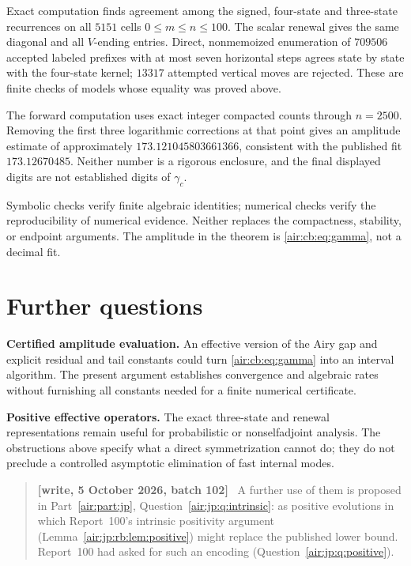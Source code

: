 \documentclass[11pt,letterpaper]{article}
\numberwithin{equation}{section}
\theoremstyle{remark}
\newenvironment{writenotejp}{\par\smallskip\begin{quote}\small\textbf{[write, 5 October 2026, batch 102]}\ }{\end{quote}\smallskip}
\begin{document}
Exact computation finds agreement among the signed, four-state and
three-state recurrences on all $5151$ cells $0\le m\le n\le100$.
The scalar renewal gives the same diagonal and all $V$-ending entries.
Direct, nonmemoized enumeration of $709506$ accepted labeled prefixes with
at most seven horizontal steps agrees state by state with the four-state
kernel; $13317$ attempted vertical moves are rejected. These are finite
checks of models whose equality was proved above.

The forward computation uses exact integer compacted counts through
$n=2500$. Removing the first three logarithmic corrections at that point
gives an amplitude estimate of approximately $173.121045803661366$,
consistent with the published fit $173.12670485$. Neither number is a
rigorous enclosure, and the final displayed digits are not established
digits of $\gamma_c$.

Symbolic checks verify finite algebraic identities; numerical checks verify
the reproducibility of numerical evidence. Neither replaces the compactness,
stability, or endpoint arguments. The amplitude in the theorem is
\eqref{air:cb:eq:gamma}, not a decimal fit.

\section{Further questions}\label{air:cb:sec:questions}

\textbf{Certified amplitude evaluation.}
An effective version of the Airy gap and explicit residual and tail constants
could turn \eqref{air:cb:eq:gamma} into an interval algorithm. The present argument
establishes convergence and algebraic rates without furnishing all constants
needed for a finite numerical certificate.

\textbf{Positive effective operators.}
The exact three-state and renewal representations remain useful for
probabilistic or nonselfadjoint analysis. The obstructions above specify
what a direct symmetrization cannot do; they do not preclude a controlled
asymptotic elimination of fast internal modes.
\begin{writenotejp}
A further use of them is proposed in Part~\ref{air:part:jp}, Question~\ref{air:jp:q:intrinsic}: as positive evolutions in which Report~100's intrinsic positivity argument (Lemma~\ref{air:jp:rb:lem:positive}) might replace the published lower bound. Report~100 had asked for such an encoding (Question~\ref{air:jp:q:positive}).
\end{writenotejp}
\end{document}
